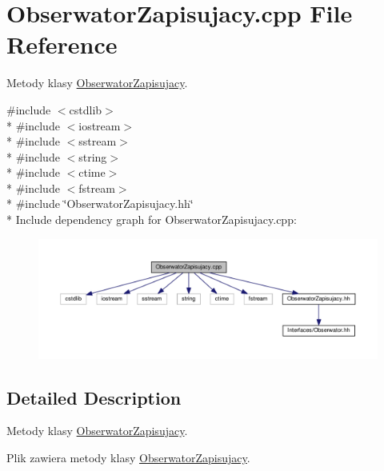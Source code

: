 \hypertarget{a00052}{}\section{Obserwator\+Zapisujacy.\+cpp File Reference}
\label{a00052}


Metody klasy \hyperlink{a00016}{Obserwator\+Zapisujacy}.  


{\ttfamily \#include $<$cstdlib$>$}\\*
{\ttfamily \#include $<$iostream$>$}\\*
{\ttfamily \#include $<$sstream$>$}\\*
{\ttfamily \#include $<$string$>$}\\*
{\ttfamily \#include $<$ctime$>$}\\*
{\ttfamily \#include $<$fstream$>$}\\*
{\ttfamily \#include \char`\"{}Obserwator\+Zapisujacy.\+hh\char`\"{}}\\*
Include dependency graph for Obserwator\+Zapisujacy.\+cpp\+:
\nopagebreak
\begin{figure}[H]
\begin{center}
\leavevmode
\includegraphics[width=350pt]{a00106}
\end{center}
\end{figure}


\subsection{Detailed Description}
Metody klasy \hyperlink{a00016}{Obserwator\+Zapisujacy}. 

Plik zawiera metody klasy \hyperlink{a00016}{Obserwator\+Zapisujacy}. 